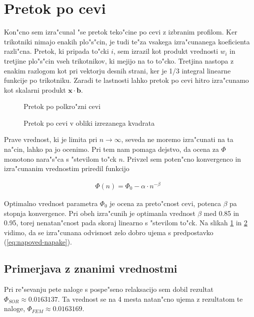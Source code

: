 \documentclass[a4paper,10pt]{article}
\renewcommand{\vec}{\mathbf}
\begin{document}
\section{Pretok po cevi}

Kon"cno sem izra"cunal "se pretok teko"cine po cevi z izbranim profilom. Ker trikotniki nimajo enakih plo"s"cin, je tudi te"za vsakega izra"cunanega koeficienta razli"cna. Pretok, ki pripada to"cki $i$, sem izrazil kot produkt vrednosti $w_i$ in tretjine plo"s"cin vseh trikotnikov, ki mejijo na to to"cko. Tretjina nastopa z enakim razlogom kot pri vektorju desnih strani, ker je 1/3 integral linearne funkcije po trikotniku. Zaradi te lastnosti lahko pretok po cevi hitro izra"cunamo kot skalarni produkt $\vec x \cdot \vec b$.  

\begin{figure}[H]
 
 \caption{Pretok po polkro"zni cevi}
 \label{fig:pretok-polkrog}
\end{figure}

\begin{figure}[H]
 
 \caption{Pretok po cevi v obliki izrezanega kvadrata}
 \label{fig:pretok-kvadrat}
\end{figure}

Prave vrednost, ki je limita pri $n\to\infty$, seveda ne moremo izra"cunati na ta na"cin, lahko pa jo ocenimo. Pri tem nam pomaga dejstvo, da ocena za $\Phi$ monotono nara"s"ca s "stevilom to"ck $n$. Privzel sem poten"cno konvergenco in izra"cunanim vrednostim priredil funkcijo

\begin{align}
\label{eq:napoved-napake}
 \Phi(n) = \Phi_0 - \alpha \cdot n^{-\beta}
\end{align}

Optimalno vrednost parametra $\Phi_0$ je ocena za preto"cnost cevi, potenca $\beta$ pa stopnja konvergence. Pri obeh izra"cunih je optimanla vrednost $\beta$ med 0.85 in 0.95, torej nenatan"cnost pada skoraj linearno s "stevilom to"ck. Na slikah \ref{fig:pretok-polkrog} in \ref{fig:pretok-kvadrat} vidimo, da se izra"cunana odvisnost zelo dobro ujema s predpostavko (\ref{eq:napoved-napake}). 

\subsection{Primerjava z znanimi vrednostmi}

Pri re"sevanju pete naloge s pospe"seno relaksacijo sem dobil rezultat $\Phi_{SOR} \approx 0.0163137$. Ta vrednost se na 4 mesta natan"cno ujema z rezultatom te naloge, $\Phi_{FEM} \approx 0.0163169$. 
\end{document}
